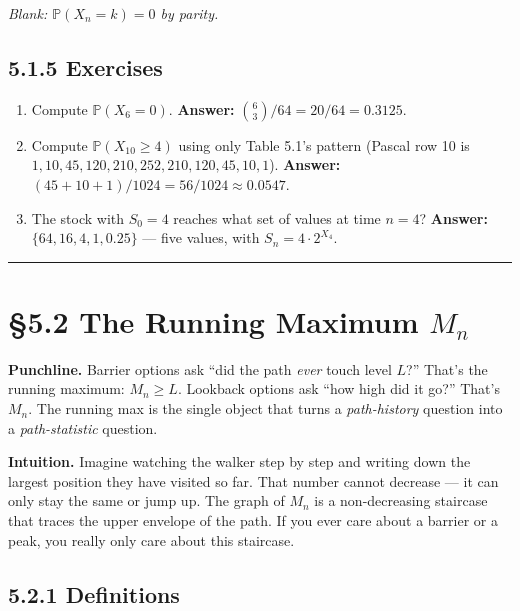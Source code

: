 \documentclass[
  10pt,
  twoside]{book}
\providecommand{\tightlist}{%
  \setlength{\itemsep}{0pt}\setlength{\parskip}{0pt}}
\begin{document}
\emph{Blank: \(\mathbb P(X_n = k) = 0\) by parity.}

\subsection{5.1.5 Exercises}\label{exercises-21}

\begin{enumerate}
\def\labelenumi{\arabic{enumi}.}
\tightlist
\item
  Compute \(\mathbb P(X_6 = 0)\). \textbf{Answer:}
  \(\binom{6}{3}/64 = 20/64 = 0.3125\).
\item
  Compute \(\mathbb P(X_{10} \ge 4)\) using only Table 5.1's pattern
  (Pascal row 10 is \(1, 10, 45, 120, 210, 252, 210, 120, 45, 10, 1\)).
  \textbf{Answer:} \((45 + 10 + 1)/1024 = 56/1024 \approx 0.0547\).
\item
  The stock with \(S_0 = 4\) reaches what set of values at time
  \(n = 4\)? \textbf{Answer:} \(\{64, 16, 4, 1, 0.25\}\) --- five
  values, with \(S_n = 4 \cdot 2^{X_4}\).
\end{enumerate}

\begin{center}\rule{0.5\linewidth}{0.5pt}\end{center}

\section{\texorpdfstring{§5.2 The Running Maximum
\(M_n\)}{§5.2 The Running Maximum M\_n}}\label{the-running-maximum-m_n}

\textbf{Punchline.} Barrier options ask ``did the path \emph{ever} touch
level \(L\)?'' That's the running maximum: \(M_n \ge L\). Lookback
options ask ``how high did it go?'' That's \(M_n\). The running max is
the single object that turns a \emph{path-history} question into a
\emph{path-statistic} question.

\textbf{Intuition.} Imagine watching the walker step by step and writing
down the largest position they have visited so far. That number cannot
decrease --- it can only stay the same or jump up. The graph of \(M_n\)
is a non-decreasing staircase that traces the upper envelope of the
path. If you ever care about a barrier or a peak, you really only care
about this staircase.

\subsection{5.2.1 Definitions}\label{definitions-16}
\end{document}
